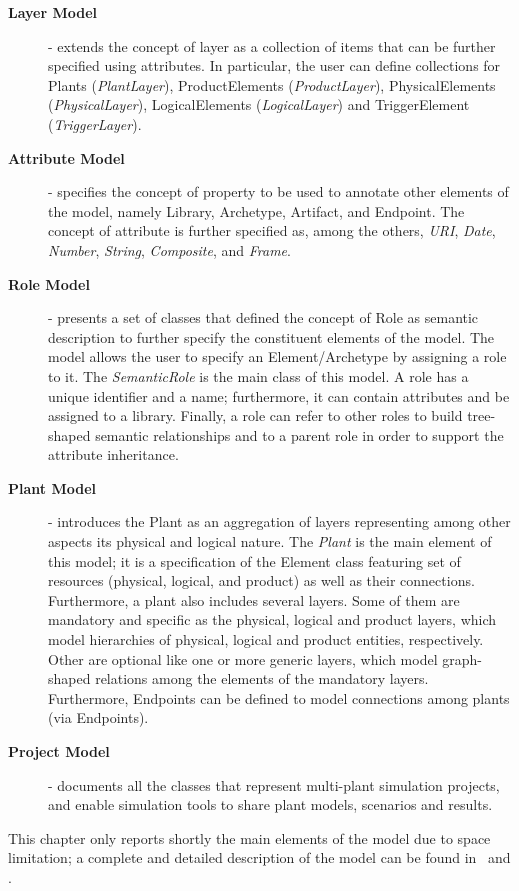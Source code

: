 \begin{description}
\item[\textbf{Layer Model}] -  extends the concept of layer as a collection of items that can be further specified using attributes. In particular, the user can define collections for Plants (\textit{PlantLayer}), ProductElements (\textit{ProductLayer}), PhysicalElements (\textit{PhysicalLayer}), LogicalElements (\textit{LogicalLayer}) and TriggerElement (\textit{TriggerLayer}).
	\item[\textbf{Attribute Model}] - specifies the concept of property to be used to annotate other elements of the model, namely Library, Archetype, Artifact, and Endpoint. The concept of attribute is further specified as, among the others, \textit{URI}, \textit{Date}, \textit{Number}, \textit{String}, \textit{Composite}, and \textit{Frame}.
	\item[\textbf{Role Model}] - presents a set of classes that defined the concept of Role as semantic description to further specify the constituent elements of the model. The model allows the user to specify an Element/Archetype by assigning a role to it. The \textit{SemanticRole} is the main class of this model. A role has a unique identifier and a name; furthermore, it can contain attributes and be assigned to a library. Finally, a role can refer to other roles to build tree-shaped semantic relationships and to a parent role in order to support the attribute inheritance.
     	\item[\textbf{Plant Model}] - introduces the Plant as an aggregation of layers representing among other aspects its physical and logical nature.  The \textit{Plant} is the main element of this model; it is a specification of the Element class featuring set of resources (physical, logical, and product) as well as their connections. 
Furthermore, a plant also includes several layers. 
Some of them are mandatory and specific as the physical, logical and product layers, which model hierarchies of physical, logical and product entities, respectively.  Other are optional like one or more generic layers, which model graph-shaped relations among the elements of the mandatory layers. Furthermore, Endpoints can be defined to model connections among plants (via Endpoints).
	\item[\textbf{Project Model}] - documents all the classes that represent multi-plant simulation projects, and enable simulation tools to share plant models, scenarios and results.  
\end{description}

This chapter only reports shortly the main elements of the model due to space limitation; a complete and detailed description of the model can be found in~\cite{Ciavotta2018} and \cite{FAR-EDGE41}.

